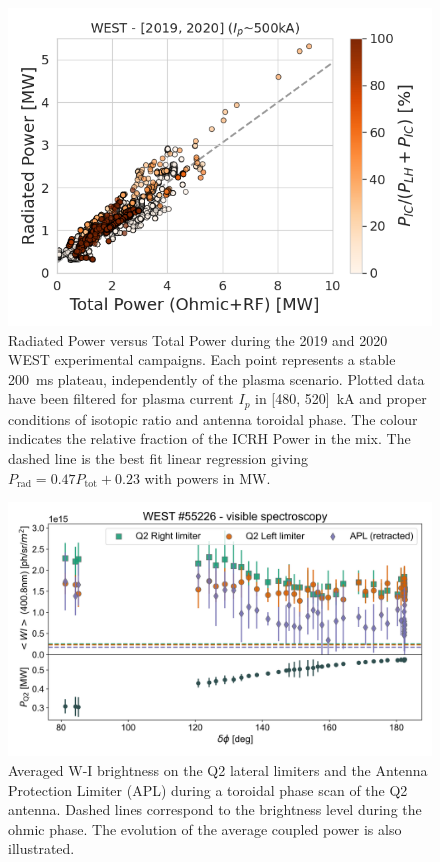 \documentclass[12p]{iopart}
\begin{document}
\begin{figure}
	\centering
	\includegraphics[width=0.95\linewidth]{figures/WEST_C4_C5_Prad_vs_Ptot}
	\caption{Radiated Power versus Total Power during the 2019 and 2020 WEST experimental campaigns. Each point represents a stable 200~ms plateau, independently of the plasma scenario. Plotted data have been filtered for plasma current $I_p$ in [480, 520]~kA and proper conditions of isotopic ratio and antenna toroidal phase. The colour indicates the relative fraction of the ICRH Power in the mix. The dashed line is the best fit linear regression giving $P_{\mathrm{rad}}=0.47 P_{\mathrm{tot}} + 0.23$ with powers in MW.}
	\label{fig:westc4c5pradvsptot}
\end{figure}

\begin{figure}
	\centering
	\includegraphics[width=0.95\linewidth]{figures/WEST_IC_55226}
	\caption{Averaged W-I brightness on the Q2 lateral limiters and the Antenna Protection Limiter (APL) during a toroidal phase scan of the Q2 antenna. Dashed lines correspond to the brightness level during the ohmic phase. The evolution of the average coupled power is also illustrated.}
	\label{fig:westic5522355226}
\end{figure}
\end{document}
